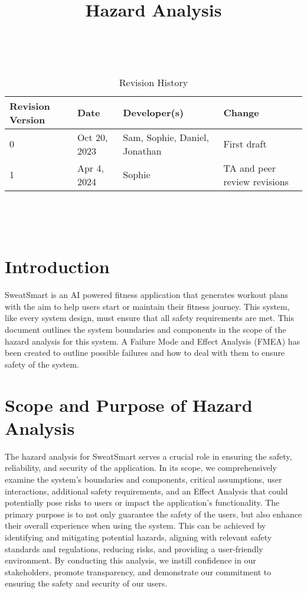 \documentclass{article}
\title{Hazard Analysis\\\progname}
\author{\authname}
\date{}
\begin{document}
\maketitle
\thispagestyle{empty}

~\newpage


\begin{table}[hp]
	\centering
    \caption{Revision History} \label{TblRevisionHistory}
	\begin{tabularx}{\textwidth}{lllX}
		\toprule
		\textbf{Revision Version} & \textbf{Date} & \textbf{Developer(s)} & \textbf{Change}\\
		\midrule
			0 & Oct 20, 2023 & Sam, Sophie, Daniel, Jonathan & First draft\\
            1 & Apr 4, 2024 & Sophie & TA and peer review revisions\\
		\bottomrule
	\end{tabularx}
\end{table}

~\newpage

\tableofcontents

~\newpage


\section{Introduction}

SweatSmart is an AI powered fitness application that generates workout plans with the aim to help users start or maintain their fitness journey. This system, like every system design, must ensure that all safety requirements are met. This document outlines the system boundaries and components in the scope of the hazard analysis for this system. A Failure Mode and Effect Analysis (FMEA) has been created to outline possible failures and how to deal with them to ensure safety of the system. 

\section{Scope and Purpose of Hazard Analysis}
The hazard analysis for SweatSmart serves a crucial role in ensuring the safety, reliability, and security of the application. In its scope, we comprehensively examine the system's boundaries and components, critical assumptions, user interactions, additional safety requirements, and an Effect Analysis that could potentially pose risks to users or impact the application's functionality. The primary purpose is to not only guarantee the safety of the users, but also enhance their overall experience when using the system. This can be achieved by identifying and mitigating potential hazards, aligning with relevant safety standards and regulations, reducing risks, and providing a user-friendly environment. By conducting this analysis, we instill confidence in our stakeholders, promote transparency, and demonstrate our commitment to ensuring the safety and security of our users.
\end{document}

